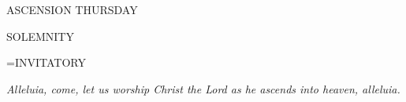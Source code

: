 \begin{center}
\normalsize \begin{center}\normalsize ASCENSION THURSDAY\\
\end{center}
\footnotesize SOLEMNITY\\
\end{center}

\hangindent=\parindent \small{INVITATORY}
\begin{center}
\textit{Alleluia, come, let us worship Christ the Lord as he ascends into heaven, alleluia.\\}
\end{center}

